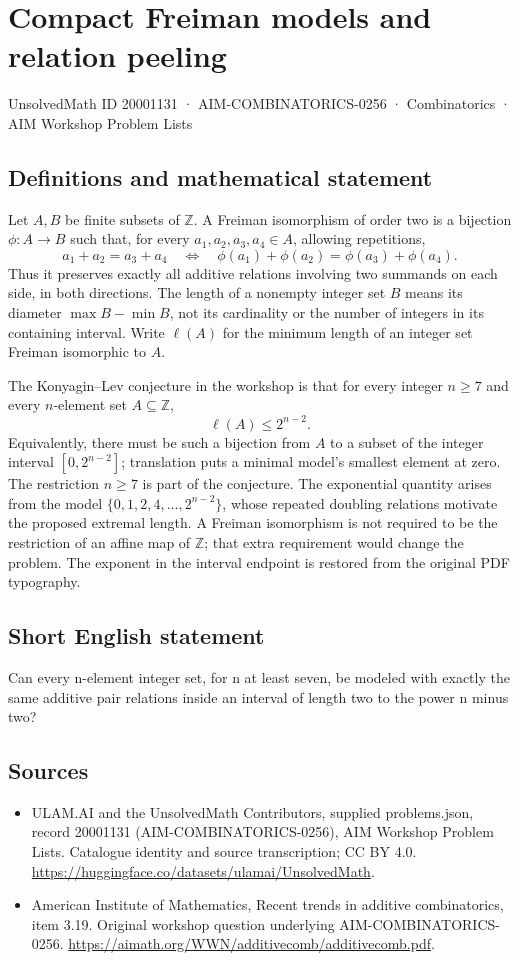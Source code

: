 \documentclass[11pt,a4paper]{article}
\begin{document}
\section*{Compact Freiman models and relation peeling}\label{20001131}
{\small UnsolvedMath ID 20001131 · AIM-COMBINATORICS-0256 · Combinatorics · AIM Workshop Problem Lists}
\subsection{Definitions and mathematical statement}
Let $A,B$ be finite subsets of $\mathbb Z$. A Freiman isomorphism
of order two is a bijection $\phi:A\to B$ such that, for every
$a_1,a_2,a_3,a_4\in A$, allowing repetitions,
\[
 a_1+a_2=a_3+a_4
 \quad\Longleftrightarrow\quad
 \phi(a_1)+\phi(a_2)=\phi(a_3)+\phi(a_4).
\]
Thus it preserves exactly all additive relations involving two
summands on each side, in both directions. The length of a nonempty
integer set $B$ means its diameter $\max B-\min B$, not its
cardinality or the number of integers in its containing interval.
Write $\ell(A)$ for the minimum length of an integer set Freiman
isomorphic to $A$.

The Konyagin--Lev conjecture in the workshop is that for every
integer $n\ge7$ and every $n$-element set $A\subseteq\mathbb Z$,
\[
                                  \ell(A)\le2^{n-2}.
\]
Equivalently, there must be such a bijection from $A$ to a subset
of the integer interval $[0,2^{n-2}]$; translation puts a minimal
model's smallest element at zero. The restriction $n\ge7$ is part
of the conjecture.
The exponential quantity arises from the model
$\{0,1,2,4,\ldots,2^{n-2}\}$, whose repeated doubling relations
motivate the proposed extremal length. A Freiman isomorphism is not
required to be the restriction of an affine map of $\mathbb Z$;
that extra requirement would change the problem. The exponent in
the interval endpoint is restored from the original PDF typography.
\subsection{Short English statement}
Can every n-element integer set, for n at least seven, be modeled with exactly the same additive pair relations inside an interval of length two to the power n minus two?
\subsection{Sources}
\begin{itemize}
\item[S1] ULAM.AI and the UnsolvedMath Contributors, supplied problems.json, record 20001131 (AIM-COMBINATORICS-0256), AIM Workshop Problem Lists. Catalogue identity and source transcription; CC BY 4.0.
\url{https://huggingface.co/datasets/ulamai/UnsolvedMath}.
\item[S2] American Institute of Mathematics, Recent trends in additive combinatorics, item 3.19. Original workshop question underlying AIM-COMBINATORICS-0256.
\url{https://aimath.org/WWN/additivecomb/additivecomb.pdf}.
\end{itemize}
\end{document}
